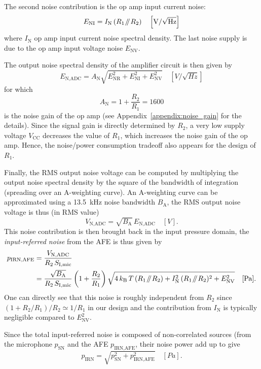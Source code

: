 \documentclass{EPL-master-thesis-covers-EN}
\newcommand{\parallelsum}{\mathbin{\!/\mkern-5mu/\!}}
\newcommand{\te}[1]{\textrm{#1}}
\begin{document}
The second noise contribution is the op amp input current noise:
\[
 E_\te{NI} = I_\te{N} \, (R_1 \parallelsum R_2) \quad \left[\si{V/\sqrt{Hz}}\right]
\]
where $I_\te{N}$ op amp input current noise spectral density. The last noise supply is due to the op amp input voltage noise $E_\te{NV}$.

The output noise spectral density of the amplifier circuit is then given by
\[
 E_\te{N,ADC} = A_\te{N} \sqrt{E_\te{NR}^2 + E_\te{NI}^2 + E_\te{NV}^2} \quad \left[\si{V/\sqrt{Hz}}\right]
\]
for which
\[
 A_\te{N} = 1 + \frac{R_2}{R_1} = 1600
\]
is the noise gain of the op amp (see Appendix~\ref{appendix:noise_gain} for the details). Since the signal gain is directly determined by $R_2$, a very low supply voltage $V_\te{CC}$ decreases the value of $R_1$, which increases the noise gain of the op amp. Hence, the noise/power consumption tradeoff also appears for the design of $R_1$.

Finally, the RMS output noise voltage can be computed by multiplying the output noise spectral density by the square of the bandwidth of integration (spreading over an A-weighting curve). An A-weighting curve can be approximated using a \SI{13.5}{kHz} noise bandwidth $B_\te{A}$, the RMS output noise voltage is thus (in RMS value)
\[
 V_\te{N,ADC} = \sqrt{B_\te{A}} \, E_\te{N,ADC} \quad [\si{V}].
\]
This noise contribution is then brought back in the input pressure domain, the \textit{input-referred noise} from the AFE is thus given by
\begin{align*}
  p_\te{IRN,AFE} &= \frac{V_\te{N,ADC}}{R_2\,S_{\te{I,mic}}}\\
   &= \frac{\sqrt{B_\te{A}}}{R_2\,S_{\te{I,mic}}} \left(1 + \frac{R_2}{R_1}\right) \sqrt{4 \, k_\te{B} \, T \, (R_1 \parallelsum R_2) + I_\te{N}^2 \, (R_1 \parallelsum R_2)^2 + E_\te{NV}^2} \quad \si{[Pa]}.
\end{align*}
One can directly see that this noise is roughly independent from $R_2$ since $(1+R_2/R_1)/R_2\simeq 1/R_1$ in our design and the contribution from $I_\te{N}$ is typically negligible compared to $E_\te{NV}^2$.

Since the total input-referred noise is composed of non-correlated sources (from the microphone $p_{\te{SN}}$ and the AFE $ p_\te{IRN,AFE}$, their noise power add up to give
\[
 p_\te{IRN} = \sqrt{p_{\te{SN}}^2 + p_\te{IRN,AFE}^2} \quad \si{[Pa]}.
\]
\end{document}
